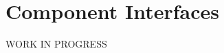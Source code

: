 \documentclass[../../DD.tex]{subfiles}
\begin{document}
\section{Component Interfaces}
	WORK IN PROGRESS
	
\end{document}

